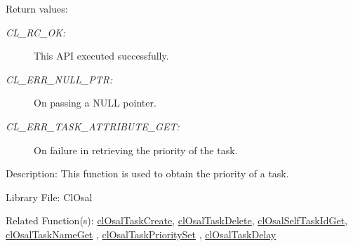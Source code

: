 \begin{Desc}
\item[Return values:]
\begin{description}
\item[{\em CL\_\-RC\_\-OK:}]This API executed successfully. \item[{\em CL\_\-ERR\_\-NULL\_\-PTR:}]On passing a NULL pointer. \item[{\em CL\_\-ERR\_\-TASK\_\-ATTRIBUTE\_\-GET:}]On failure in retrieving the priority of the task.\end{description}
\end{Desc}
\begin{Desc}
\item[Description:]This function is used to obtain the priority of a task.\end{Desc}
\begin{Desc}
\item[Library File:]Cl\-Osal\end{Desc}
\begin{Desc}
\item[Related Function(s):]\hyperlink{pageosal103}{cl\-Osal\-Task\-Create}, \hyperlink{pageosal104}{cl\-Osal\-Task\-Delete}, 
\hyperlink{pageosal105}{cl\-Osal\-Self\-Task\-Id\-Get}, \hyperlink{pageosal106}{cl\-Osal\-Task\-Name\-Get} , 
\hyperlink{pageosal108}{cl\-Osal\-Task\-Priority\-Set} , \hyperlink{pageosal109}{cl\-Osal\-Task\-Delay} \end{Desc}

\newpage
